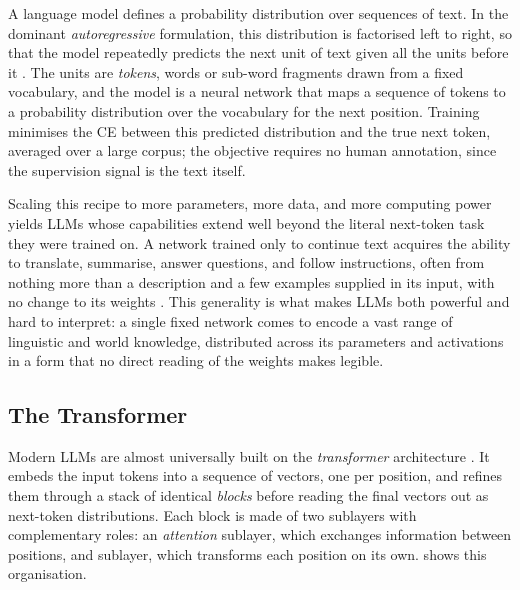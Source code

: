 A language model defines a probability distribution over sequences of text. In
the dominant \textit{autoregressive} formulation, this distribution is
factorised left to right, so that the model repeatedly predicts the next unit of
text given all the units before it \citep{radfordLanguageModelsAre2019}. The
units are \textit{tokens}, words or sub-word fragments drawn from a fixed
vocabulary, and the model is a neural network that maps a sequence of tokens to
a probability distribution over the vocabulary for the next position. Training
minimises the \ac{CE} between this predicted distribution and the true next
token, averaged over a large corpus; the objective requires no human annotation,
since the supervision signal is the text itself.

Scaling this recipe to more parameters, more data, and more computing power
yields \acp{LLM} whose capabilities extend well beyond the literal next-token
task they were trained on. A network trained only to continue text acquires the
ability to translate, summarise, answer questions, and follow instructions,
often from nothing more than a description and a few examples supplied in its
input, with no change to its weights \citep{brownLanguageModelsAre2020,
dongSurveyIncontextLearning2024}. This generality is what makes \acp{LLM} both
powerful and hard to interpret: a single fixed network comes to encode a vast
range of linguistic and world knowledge, distributed across its parameters and
activations in a form that no direct reading of the weights makes legible.

\subsection{The Transformer} \label{sec:background:nlp:transformer}

Modern \acp{LLM} are almost universally built on the \textit{transformer}
architecture \citep{vaswaniAttentionAllYou2017}. It embeds the input tokens into
a sequence of vectors, one per position, and refines them through a stack
of identical \textit{blocks} before reading the final vectors out as next-token
distributions. Each block is made of two sublayers with complementary roles: an
\textit{attention} sublayer, which exchanges information between positions, and
 sublayer, which transforms each position on its own.
 shows this organisation.

